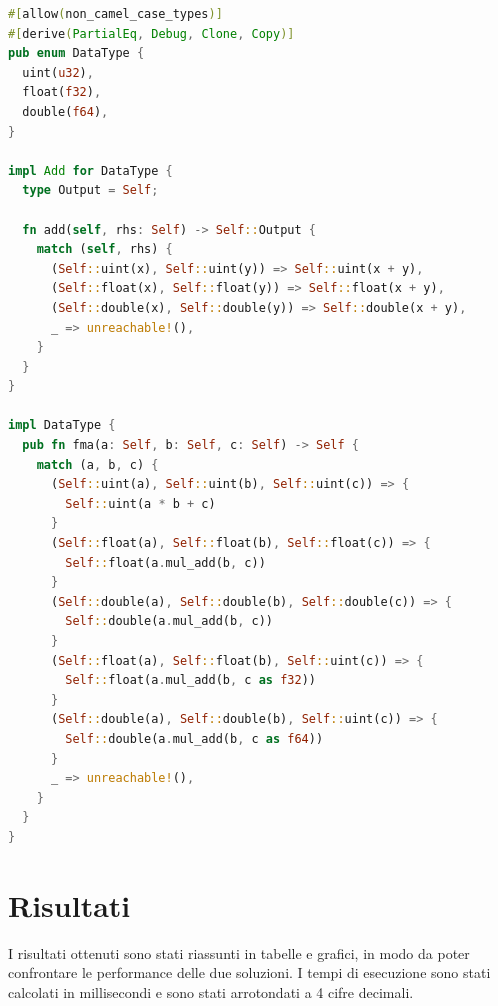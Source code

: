 \newpage
\vspace{5mm}
\begin{lstlisting}[language=Rust, caption=Loading shader con generics, label=lis:generic_rust]
#[allow(non_camel_case_types)]
#[derive(PartialEq, Debug, Clone, Copy)]
pub enum DataType {
  uint(u32),
  float(f32),
  double(f64),
}

impl Add for DataType {
  type Output = Self;

  fn add(self, rhs: Self) -> Self::Output {
    match (self, rhs) {
      (Self::uint(x), Self::uint(y)) => Self::uint(x + y),
      (Self::float(x), Self::float(y)) => Self::float(x + y),
      (Self::double(x), Self::double(y)) => Self::double(x + y),
      _ => unreachable!(),
    }
  }
}

impl DataType {
  pub fn fma(a: Self, b: Self, c: Self) -> Self {
    match (a, b, c) {
      (Self::uint(a), Self::uint(b), Self::uint(c)) => {
        Self::uint(a * b + c)
      }
      (Self::float(a), Self::float(b), Self::float(c)) => {
        Self::float(a.mul_add(b, c))
      }
      (Self::double(a), Self::double(b), Self::double(c)) => {
        Self::double(a.mul_add(b, c))
      }
      (Self::float(a), Self::float(b), Self::uint(c)) => {
        Self::float(a.mul_add(b, c as f32))
      }
      (Self::double(a), Self::double(b), Self::uint(c)) => {
        Self::double(a.mul_add(b, c as f64))
      }
      _ => unreachable!(),
    }
  }
}

\end{lstlisting}
\vspace{5mm}



\section{Risultati}

I risultati ottenuti sono stati riassunti in tabelle e grafici, in modo da poter confrontare le performance delle due soluzioni. I tempi di esecuzione sono stati calcolati in millisecondi e sono stati arrotondati a 4 cifre decimali.
